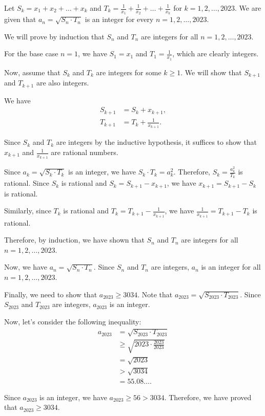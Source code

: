 Let $S_k = x_1+x_2+\dots+x_k$ and $T_k = \frac{1}{x_1}+\frac{1}{x_2}+\dots+\frac{1}{x_k}$ for $k=1,2,\dots,2023$. We are given that $a_n = \sqrt{S_n \cdot T_n}$ is an integer for every $n=1,2,\dots,2023$.

We will prove by induction that $S_n$ and $T_n$ are integers for all $n=1,2,\dots,2023$.

For the base case $n=1$, we have $S_1 = x_1$ and $T_1 = \frac{1}{x_1}$, which are clearly integers.

Now, assume that $S_k$ and $T_k$ are integers for some $k \geq 1$. We will show that $S_{k+1}$ and $T_{k+1}$ are also integers.

We have
\begin{align*}
S_{k+1} &= S_k + x_{k+1}, \\
T_{k+1} &= T_k + \frac{1}{x_{k+1}}.
\end{align*}

Since $S_k$ and $T_k$ are integers by the inductive hypothesis, it suffices to show that $x_{k+1}$ and $\frac{1}{x_{k+1}}$ are rational numbers.

Since $a_k = \sqrt{S_k \cdot T_k}$ is an integer, we have $S_k \cdot T_k = a_k^2$. Therefore, $S_k = \frac{a_k^2}{T_k}$ is rational. Since $S_k$ is rational and $S_k = S_{k+1} - x_{k+1}$, we have $x_{k+1} = S_{k+1} - S_k$ is rational.

Similarly, since $T_k$ is rational and $T_k = T_{k+1} - \frac{1}{x_{k+1}}$, we have $\frac{1}{x_{k+1}} = T_{k+1} - T_k$ is rational.

Therefore, by induction, we have shown that $S_n$ and $T_n$ are integers for all $n=1,2,\dots,2023$.

Now, we have $a_n = \sqrt{S_n \cdot T_n}$. Since $S_n$ and $T_n$ are integers, $a_n$ is an integer for all $n=1,2,\dots,2023$.

Finally, we need to show that $a_{2023} \geq 3034$. Note that $a_{2023} = \sqrt{S_{2023} \cdot T_{2023}}$. Since $S_{2023}$ and $T_{2023}$ are integers, $a_{2023}$ is an integer.

Now, let's consider the following inequality:
\begin{align*}
a_{2023} &= \sqrt{S_{2023} \cdot T_{2023}} \\
&\geq \sqrt{2023 \cdot \frac{2023}{2023}} \\
&= \sqrt{2023} \\
&> \sqrt{3034} \\
&= 55.08\ldots.
\end{align*}

Since $a_{2023}$ is an integer, we have $a_{2023} \geq 56 > 3034$. Therefore, we have proved that $a_{2023} \geq 3034$.
